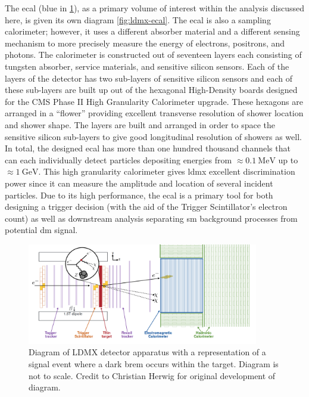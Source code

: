 The \ac{ecal} (blue in \cref{fig:ldmx-det}), as a primary volume of interest within the analysis
discussed here, is given its own diagram \cref{fig:ldmx-ecal}. The \ac{ecal} is also a sampling
calorimeter; however, it uses a different absorber material and a different sensing mechanism to
more precisely measure the energy of electrons, positrons, and photons. The calorimeter is constructed
out of seventeen layers each consisting of tungsten absorber, service materials, and sensitive silicon
sensors. Each of the layers of the detector has two sub-layers of sensitive silicon sensors and each
of these sub-layers are built up out of the hexagonal High-Density boards designed for the CMS
Phase II High Granularity Calorimeter upgrade\cite{cms-phase-2-tdr}. These hexagons are arranged in a ``flower''
providing excellent transverse resolution of shower location and shower shape. The layers are built
and arranged in order to space the sensitive silicon sub-layers to give good longitudinal resolution
of showers as well. In total, the designed \ac{ecal} has more than one hundred thousand channels that
can each individually detect particles depositing energies from $\approx \qty{0.1}{\mega\electronvolt}$ up to
$\approx\qty{1}{\giga\electronvolt}$.
This high granularity calorimeter gives \ac{ldmx} excellent discrimination power
since it can measure the amplitude and location of several incident particles.
Due to its high performance, the \ac{ecal} is a primary tool for
both designing a trigger decision (with the aid of the Trigger Scintillator's electron count) as well
as downstream analysis separating \ac{sm} background processes from potential \ac{dm} signal.

\begin{figure}
	\centering
	\includegraphics[width=0.9\textwidth]{figures/ldmx/experiment/detector.png}
	\caption{
		Diagram of LDMX detector apparatus with a representation of a signal event where
		a dark brem occurs within the target. Diagram is not to scale. Credit to Christian Herwig
		for original development of diagram.
	}
	\label{fig:ldmx-det}
\end{figure}

